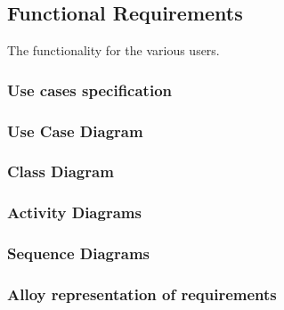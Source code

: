 \subsection{Functional Requirements}
The functionality for the various users.
\subsubsection{Use cases specification}

\subsubsection{Use Case Diagram}
\subsubsection{Class Diagram}
\subsubsection{Activity Diagrams}
\subsubsection{Sequence Diagrams}
\subsubsection{Alloy representation of requirements}
